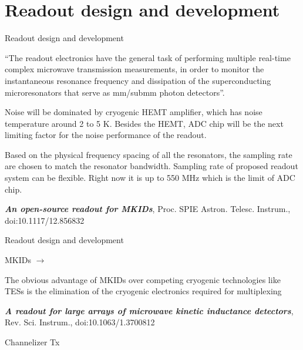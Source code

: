\documentclass[ignorenonframetext,12pt]{beamer}
\begin{document}
\section{Readout design and development}
\begin{frame}{Readout design and development}

				{\color[rgb]{0.8,.4,.5} ``The readout electronics have the general task of performing multiple
				real-time complex microwave transmission measurements, in order to
				monitor the instantaneous resonance frequency and dissipation of the
				superconducting microresonators that serve as mm/submm photon
				detectors''.}

				Noise will be dominated by cryogenic HEMT amplifier, which has noise
				temperature around 2 to 5 K. Besides the HEMT, ADC chip will be the next
				limiting factor for the noise performance of the readout. 

				Based on the physical frequency spacing of all the resonators, the
				sampling rate are chosen to match the resonator bandwidth. Sampling rate
				of proposed readout system can be flexible.
				Right now it is up to 550 MHz which is the limit of ADC chip.

				\emph{\textbf{An open-source readout for MKIDs}}, Proc. SPIE Astron. Telesc.
				Instrum., doi:10.1117/12.856832
\end{frame}
\begin{frame}{Readout design and development}

				MKIDs $\to$ 

				The obvious advantage of MKIDs over competing cryogenic technologies
				like TESs is the elimination of the cryogenic electronics required for multiplexing

				\emph{\textbf{A readout for large arrays of microwave kinetic inductance
				detectors}}, Rev. Sci. Instrum., doi:10.1063/1.3700812
\end{frame}
\begin{frame}{Channelizer Tx}
				\begin{center}
				\end{center}
								\begin{center}
								\end{center}
\end{frame}
\end{document}
